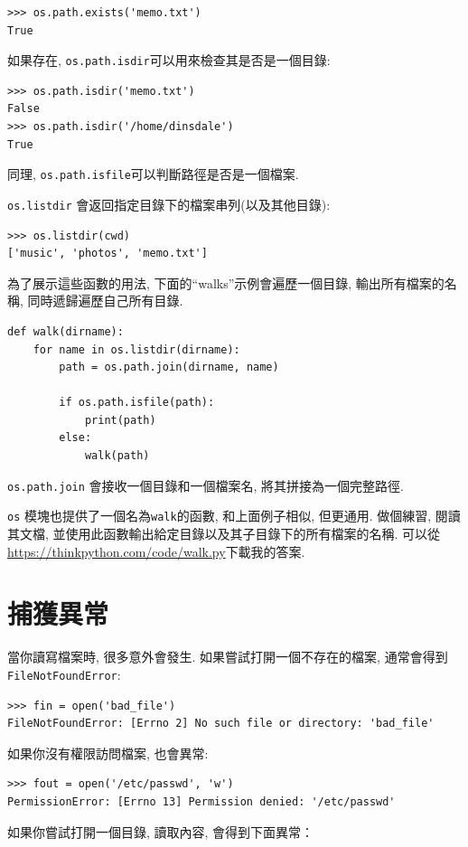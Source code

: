 \documentclass[10pt]{book}
\begin{document}
\begin{verbatim}
>>> os.path.exists('memo.txt')
True
\end{verbatim}
%
如果存在, {\tt os.path.isdir}可以用來檢查其是否是一個目錄:

\begin{verbatim}
>>> os.path.isdir('memo.txt')
False
>>> os.path.isdir('/home/dinsdale')
True
\end{verbatim}
%
同理, {\tt os.path.isfile}可以判斷路徑是否是一個檔案. 

{\tt os.listdir} 會返回指定目錄下的檔案串列(以及其他目錄):

\begin{verbatim}
>>> os.listdir(cwd)
['music', 'photos', 'memo.txt']
\end{verbatim}
%
為了展示這些函數的用法, 下面的``walks''示例會遍歷一個目錄, 
輸出所有檔案的名稱, 同時遞歸遍歷自己所有目錄. 

\begin{verbatim}
def walk(dirname):
    for name in os.listdir(dirname):
        path = os.path.join(dirname, name)

        if os.path.isfile(path):
            print(path)
        else:
            walk(path)
\end{verbatim}
%

{\tt os.path.join} 會接收一個目錄和一個檔案名, 將其拼接為一個完整路徑. 

{\tt os} 模塊也提供了一個名為{\tt walk}的函數, 和上面例子相似, 但更通用. 
做個練習, 閱讀其文檔, 並使用此函數輸出給定目錄以及其子目錄下的所有檔案的名稱. 
可以從\url{https://thinkpython.com/code/walk.py}下載我的答案. 


\section{捕獲異常}
\label{catch}

當你讀寫檔案時, 很多意外會發生. 
如果嘗試打開一個不存在的檔案, 通常會得到{\tt FileNotFoundError}:

\begin{verbatim}
>>> fin = open('bad_file')
FileNotFoundError: [Errno 2] No such file or directory: 'bad_file'

\end{verbatim}
%
如果你沒有權限訪問檔案, 也會異常:

\begin{verbatim}
>>> fout = open('/etc/passwd', 'w')
PermissionError: [Errno 13] Permission denied: '/etc/passwd'
\end{verbatim}
%
如果你嘗試打開一個目錄, 讀取內容, 會得到下面異常：
\end{document}
